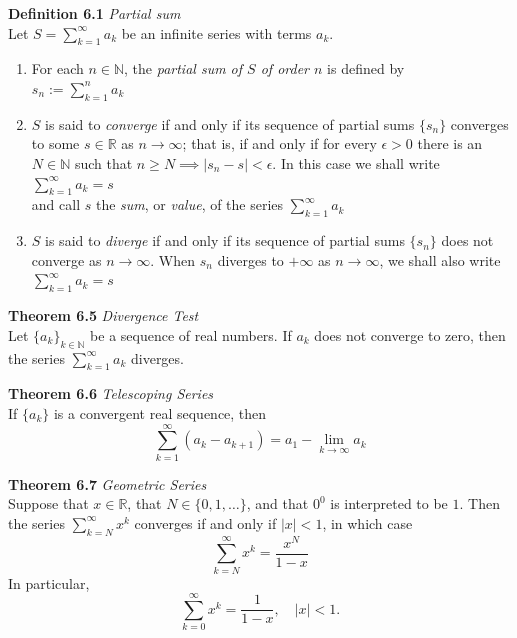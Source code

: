 \documentclass[8pt,landscape]{article}
\begin{document}
\begin{multicols}{3}
    \textbf{Definition 6.1} \emph{Partial sum} \\
    Let $S = \sum_{k=1}^\infty a_k$ be an infinite series with terms $a_k$.
    \begin{enumerate}
        \item For each $n \in \mathbb{N}$, the \emph{partial sum of $S$ of order $n$}
            is defined by \\
            $s_n := \sum_{k=1}^n a_k$
        \item $S$ is said to \emph{converge} if and only if its sequence of partial sums
            $\{s_n\}$ converges to some $s \in \mathbb{R}$ as $n \to \infty$;
            that is, if and only if for every $\epsilon > 0$ there is an
            $N \in \mathbb{N}$ such that $n \geq N \implies |s_n - s| < \epsilon$.
            In this case we shall write \\
            $\sum_{k=1}^\infty a_k = s$ \\
            and call $s$ the \emph{sum}, or \emph{value}, of the series
            $\sum_{k=1}^\infty a_k$
        \item $S$ is said to \emph{diverge} if and only if its sequence of partial sums
            $\{s_n\}$ does not converge as $n \to \infty$.
            When $s_n$ diverges to $+\infty$ as $n \to \infty$, we shall also write \\
            $\sum_{k=1}^\infty a_k = s$
    \end{enumerate}

    \textbf{Theorem 6.5} \emph{Divergence Test} \\
    Let ${\{a_k\}}_{k \in \mathbb{N}}$ be a sequence of real numbers.
    If $a_k$ does not converge to zero, then the series $\sum_{k=1}^\infty a_k$ diverges.

    \textbf{Theorem 6.6} \emph{Telescoping Series} \\
    If $\{a_k\}$ is a convergent real sequence, then
    \[
        \sum_{k=1}^\infty (a_k - a_{k+1}) = a_1 - \lim_{k \to \infty} a_k
    \]

    \textbf{Theorem 6.7} \emph{Geometric Series} \\
    Suppose that $x \in \mathbb{R}$, that $N \in \{ 0, 1, \ldots\}$, and that $0^0$
    is interpreted to be $1$.
    Then the series $\sum_{k=N}^\infty x^k$ converges if and only if $|x| < 1$,
    in which case
    \[
        \sum_{k=N}^\infty x^k = \frac{x^N}{1-x}
    \]
    In particular,
    \[
        \sum_{k=0}^\infty x^k = \frac{1}{1-x}, \quad |x| < 1.
    \]


\end{multicols}
\end{document}
